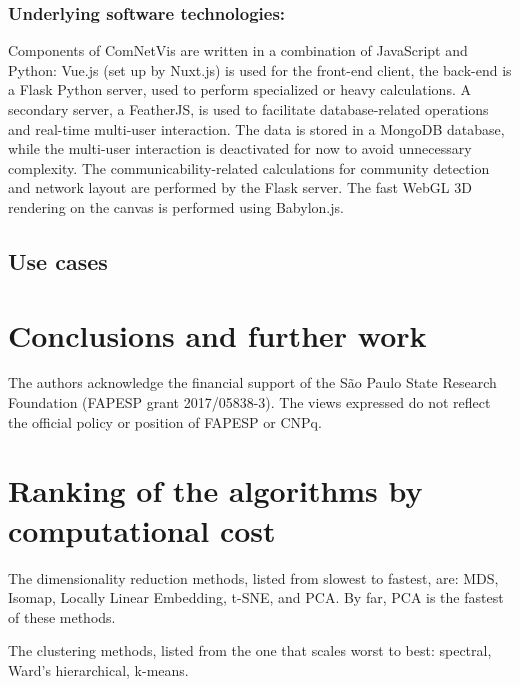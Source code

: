 \documentclass[Afour,sagev,times]{sagej}
\begin{document}
\subsubsection{Underlying software technologies:}
Components of ComNetVis are written in a combination of JavaScript and Python: Vue.js (set up by Nuxt.js) is used for the front-end client, the back-end is a Flask Python server, used to perform specialized or heavy calculations.
A secondary server, a FeatherJS, is used to facilitate database-related operations and real-time multi-user interaction.
The data is stored in a MongoDB database,
while the multi-user interaction is deactivated for now to avoid unnecessary complexity.
The communicability-related calculations for community detection and network layout are performed by the Flask server.
The fast WebGL 3D rendering on the canvas is performed using Babylon.js.

\subsection{Use cases}

\section{Conclusions and further work}
\begin{acks}
The authors acknowledge the financial support of the S\~ao Paulo State Research Foundation (FAPESP grant 2017/05838-3).
The views expressed do not reflect the official policy or position of FAPESP or CNPq.
\end{acks}

\appendix
\section{Ranking of the algorithms by computational cost}
The dimensionality reduction methods, listed from 
slowest to fastest, are:
MDS,
Isomap,
Locally Linear Embedding,
t-SNE,
and PCA.
By far, PCA is the fastest of these methods.


The clustering methods, 
listed from the one that scales worst to best:
spectral,
Ward's hierarchical,
k-means.

\theendnotes



% 
% 

\end{document}
